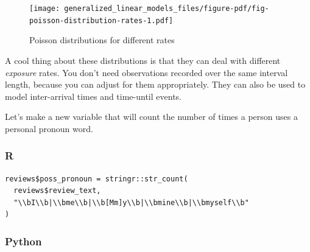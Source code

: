 \documentclass[
  letterpaper,
]{krantz}
\begin{document}
\begin{figure}

{\centering \texttt{[image: generalized\_linear\_models\_files/figure-pdf/fig-poisson-distribution-rates-1.pdf]}

}

\caption{\label{fig-poisson-distribution-rates}Poisson distributions for
different rates}

\end{figure}

\begin{tcolorbox}[enhanced jigsaw, toprule=.15mm, arc=.35mm, rightrule=.15mm, bottomrule=.15mm, leftrule=.75mm, breakable, colframe=quarto-callout-note-color-frame, colback=white, left=2mm, opacityback=0]
\begin{minipage}[t]{5.5mm}
\textcolor{quarto-callout-note-color}{\faInfo}
\end{minipage}%
\begin{minipage}[t]{\textwidth - 5.5mm}

A cool thing about these distributions is that they can deal with
different \emph{exposure} rates. You don't need observations recorded
over the same interval length, because you can adjust for them
appropriately. They can also be used to model inter-arrival times and
time-until events.

\end{minipage}%
\end{tcolorbox}

Let's make a new variable that will count the number of times a person
uses a personal pronoun word.

\subsubsection{R}

\begin{verbatim}
reviews$poss_pronoun = stringr::str_count(
  reviews$review_text, 
  "\\bI\\b|\\bme\\b|\\b[Mm]y\\b|\\bmine\\b|\\bmyself\\b"
)
\end{verbatim}

\subsubsection{Python}
\end{document}
